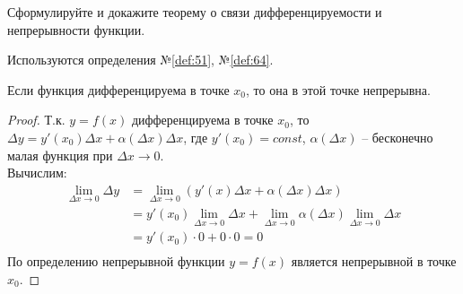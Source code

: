 \begin{question}
    Сформулируйте и докажите теорему о связи дифференцируемости и непрерывности функции.
\end{question}
\begin{used}
    Используются определения №\ref{def:51}, №\ref{def:64}.
\end{used}
\begin{theorem}
    Если функция дифференцируема в точке $x_0$, то она в этой точке непрерывна.
\end{theorem}
\begin{proof}
    Т.к. $y = f(x)$ дифференцируема в точке $x_0$, то $\Delta y = y'(x_0) \Delta x + \alpha(\Delta x) \Delta x$, где $y'(x_0) = const$, $\alpha(\Delta x)$ -- бесконечно малая функция при  $\Delta x \to 0$. \\
    Вычислим:
    \begin{align*}
        \lim_{\Delta x \to 0} \Delta y &= \lim_{\Delta x \to 0} (y'(x) \Delta x + \alpha(\Delta x) \Delta x) \\
            &= y'(x_0) \lim_{\Delta x \to 0} \Delta x + \lim_{\Delta x \to 0} \alpha(\Delta x) \lim_{\Delta x \to 0} \Delta x \\
            &= y'(x_0) \cdot 0 + 0 \cdot 0 = 0 \\
    \end{align*}
    По определению непрерывной функции $y = f(x)$ является непрерывной в точке $x_0$.
\end{proof}
\pagebreak



